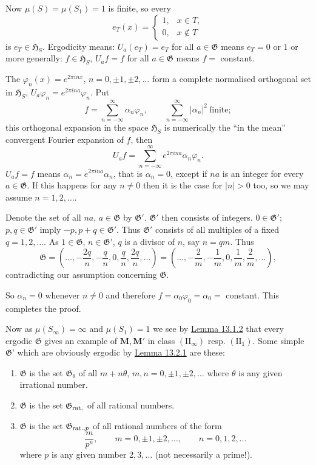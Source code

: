 \documentclass[12pt,b5paper,twoside]{article}
\newcommand{\Hspace}{\mathfrak H}
\newcommand{\M}{\mathbf M}
\newcommand{\lemref}[1]{\hyperref[lem:#1]{Lemma #1}}
\begin{document}
Now $\mu(S)=\mu(S_1)=1$ is finite, so every
\[
 e_T(x)=\begin{cases}
  1,&x\in T,\\
  0,&x\notin T
 \end{cases}
\]
is $e_T\in\Hspace_S$. Ergodicity means: $U_a(e_T)=e_T$ for all
$a\in\mathfrak G$ means $e_T=0$ or $1$ or more generally:
$f\in\Hspace_S$, $U_af=f$ for all $a\in\mathfrak G$ means $f={}$ constant.

The $\varphi_n(x)=e^{2\pi i n x}$, $n=0,\pm1,\pm2,\ldots$ form a complete
normalised orthogonal set in $\Hspace_S$,
$U_a\varphi_n=e^{2\pi i n a}\varphi_n$.
Put
\[
 f=\sum_{n=-\infty}^{\infty}\alpha_n\varphi_n,
 \qquad \sum_{n=-\infty}^{\infty}|\alpha_n|^2\ \text{finite};
\]
this orthogonal expansion in the space $\Hspace_S$ is numerically the ``in the
mean'' convergent Fourier expansion of $f$, then
\[
 U_af=\sum_{n=-\infty}^{\infty}e^{2\pi i n a}\alpha_n\varphi_n.
\]
$U_af=f$ means $\alpha_n=e^{2\pi i n a}\alpha_n$, that is $\alpha_n=0$,
except if $na$ is an integer for every $a\in\mathfrak G$. If this happens
for any $n\neq0$ then it is the case for $|n|>0$ too, so we may assume
$n=1,2,\ldots$.

Denote the set of all $na$, $a\in\mathfrak G$ by $\mathfrak G'$.
$\mathfrak G'$ then consists of integers. $0\in\mathfrak G'$;
$p,q\in\mathfrak G'$ imply $-p,p+q\in\mathfrak G'$. Thus $\mathfrak G'$
consists of all multiples of a fixed $q=1,2,\ldots$. As
$1\in\mathfrak G$, $n\in\mathfrak G'$, $q$ is a divisor of $n$, say
$n=qm$. Thus
\[
 \mathfrak G=
 \left(\ldots,-\frac{2q}{n},-\frac qn,0,\frac qn,\frac{2q}{n},\ldots\right)
 =\left(\ldots,-\frac2m,-\frac1m,0,\frac1m,\frac2m,\ldots\right),
\]
contradicting our assumption concerning $\mathfrak G$.

So $\alpha_n=0$ whenever $n\neq0$ and therefore
$f=\alpha_0\varphi_0=\alpha_0={}$ constant. This completes the proof.

Now as $\mu(S_\infty)=\infty$ and $\mu(S_1)=1$ we see by
\lemref{13.1.2} that every ergodic $\mathfrak G$ gives an example of
$\M,\M'$ in class $(\mathrm{II}_\infty)$ resp. $(\mathrm{II}_1)$. Some
simple $\mathfrak G$' which are obviously ergodic by \lemref{13.2.1} are
these:
\label{examples:13.2}
\begin{enumerate}[leftmargin=2.4em]
 \item[$(\alpha)$] $\mathfrak G$ is the set $\mathfrak G_\theta$ of all $m+n\theta$,
 $m,n=0,\pm1,\pm2,\ldots$ where $\theta$ is any given irrational number.
 \item[$(\beta)$] $\mathfrak G$ is the set $\mathfrak G_{\rm rat.}$ of all rational
 numbers.
 \item[$(\gamma)$] $\mathfrak G$ is the set $\mathfrak G_{{\rm rat.},p}$ of all
 rational numbers of the form
 \[
  \frac m{p^n},\qquad m=0,\pm1,\pm2,\ldots,
  \qquad n=0,1,2,\ldots
 \]
 where $p$ is any given number $2,3,\ldots$ (not necessarily a prime!).
\end{enumerate}
\end{document}
